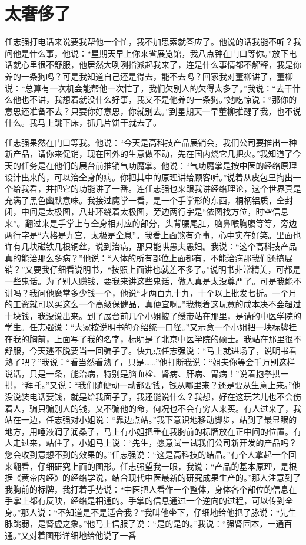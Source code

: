 \documentclass[12pt,oneside]{book}
\begin{document}
\chapter{太奢侈了}

任志强打电话来说要我帮他一个忙，我不加思索就答应了。他说的话我能不听？我问他是什么事，他说：``星期天早上你来省展览馆，我八点钟在门口等你。''放下电话就心里很不舒服，他居然大咧咧指派起我来了，连是什么事情都不解释，我是你养的一条狗吗？可是我知道自己还是得去，能不去吗？回家我对董柳讲了，董柳说：``总算有一次机会能帮他一次忙了，我们欠别人的欠得太多了。''我说：``去干什么他也不讲，我想着就没什么好事，我又不是他养的一条狗。''她吃惊说：``那你的意思还准备不去？只要你好意思，你就别去。''到星期天一早董柳推醒了我，也不说什么。我马上跳下床，抓几片饼干就去了。

任志强果然在门口等我。他说：``今天是高科技产品展销会，我们公司要推出一种新产品，请你来促销，现在国外的生意做不动，先在国内烧它几把火。''我知道了今天的任务是在他们的展台前推销气功魔掌。他说：``气功魔掌是按中医的经络原理设计出来的，可以治全身的病。你把其中的原理讲给顾客听。''说着从皮包里掏出一个给我看，并把它的功能讲了一番。连任志强也来跟我讲经络理论，这个世界真是充满了黑色幽默意味。我接过魔掌一看，是一个手掌形的东西，桐柄铝质，全封闭，中间是太极图，八卦环绕着太极图，旁边两行字是``依图找方位，时空信息来''。翻过来是手掌上与全身相对应的部分，头背腰尾肛，脑鼻喉胸腹等等，旁边两行字是``六格是九宫，太极是全息''。我看上面煞有介事，心中实在好笑。里面也许有几块磁铁几根铜丝，说到治病，那只能哄愚夫愚妇。我说：``这个高科技产品真的能治那么多病？''他说：``人体的所有部位上面都有，不能治病那我们还搞展销？''又要我仔细看说明书，``按照上面讲也就差不多了。''说明书非常精美，可都是一些鬼话。为了别人赚钱，要我来讲这些鬼话，做人真是太没尊严了。可是我能不讲吗？我问他魔掌多少钱一个，他说``才两百九十九，十个以上批发七折。一个月的工资就可以买这么一个高级保健品，真便宜啊。''我想着这玩意的成本决不会超过十块钱，我没说出来。到了展台前几个小姐披了绶带站在那里，是请的中医学院的学生。任志强说：``大家按说明书的介绍统一口径。''又示意一个小姐把一块标牌挂在我的胸前，上面写了我的名字，标明是了北京中医学院的硕士。我站在那里很不舒服，今天逃不脱要当一回骗子了。快九点任志强说：``马上就进场了，说明书看熟了吧？''我说：``看当然看熟了，只是\ldots\ldots{}''他打断我说：``姐夫你等会千万别这样说话，只是一条，能治病，特别是脑血栓、肾病、肝病、胃病！''说着抱拳拱一拱，``拜托。''又说：``我们随便动一动都要钱，钱从哪里来？还是要从生意上来。''他没说装电话要钱，就是给我面子了，我还能说什么？我想，好在这玩艺儿也不会伤着人，骗只骗别人的钱，又不骗他的命，何况也不会有穷人来买。有人过来了，我站在一边，任志强对小姐说：``靠边点站。''我下意识地移动脚步，站到了最显眼的地方，用唾液润了润桑子，马上有小姐把垂在我胸前的标牌放在正中间的位置。有人走过来，站住了，小姐马上说：``先生，愿意试一试我们公司新开发的产品吗？您会收到意想不到的效果的。''任志强说：``这是高科技的结晶。''有个人拿起一个回来翻看，仔细研究上面的图形。任志强望我一眼，我说：``产品的基本原理，是根据《黄帝内经》的经络学说，结合现代中医最新的研究成果生产的。''那人注意到了我胸前的标牌，我打着手势说：``中医把人看作一个整体，身体各个部位的信息在手掌上都有反映，经络是相通的。手掌的信息通过一个逆向的过程，可以传到全身。''那人说：``不知道是不是适合我？''我叫他坐下，仔细地给他把了脉说：``先生脉跳弱，是肾虚之象。''他马上信服了说：``是的是的。''我说：``强肾固本，一通百通。''又对着图形详细地给他说了一番
\end{document}
